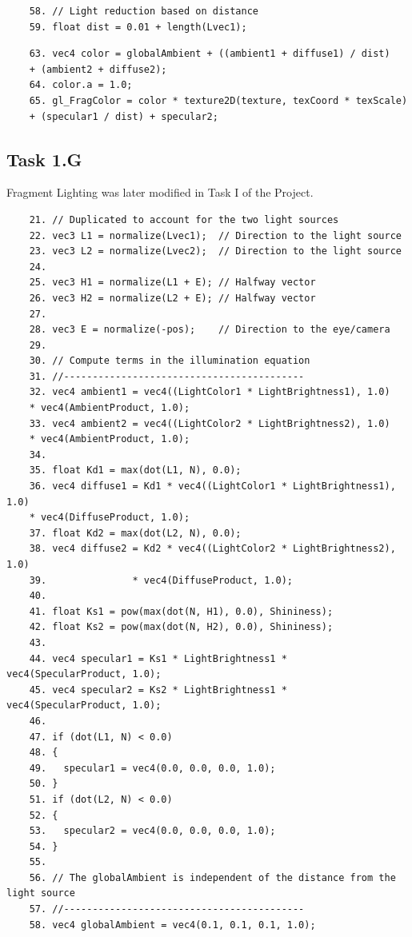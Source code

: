 \documentclass{article}
\begin{document}
\begin{commandlineF}
	\begin{verbatim}
	58. // Light reduction based on distance
	59. float dist = 0.01 + length(Lvec1);
	\end{verbatim}
\end{commandlineF}

\begin{commandlineF}
	\begin{verbatim}
	63. vec4 color = globalAmbient + ((ambient1 + diffuse1) / dist) 
	+ (ambient2 + diffuse2);
	64. color.a = 1.0;
	65. gl_FragColor = color * texture2D(texture, texCoord * texScale) 
	+ (specular1 / dist) + specular2;
	\end{verbatim}
\end{commandlineF}

\subsection{Task 1.G}\label{sec:1G}

\begin{info} %
	Fragment Lighting was later modified in Task I of the Project.
\end{info}


\begin{commandlineF}
	\begin{verbatim}
	21. // Duplicated to account for the two light sources
	22. vec3 L1 = normalize(Lvec1);  // Direction to the light source
	23. vec3 L2 = normalize(Lvec2);  // Direction to the light source
	24. 
	25. vec3 H1 = normalize(L1 + E); // Halfway vector
	26. vec3 H2 = normalize(L2 + E); // Halfway vector
	27. 
	28. vec3 E = normalize(-pos);    // Direction to the eye/camera
	29. 
	30. // Compute terms in the illumination equation
	31. //------------------------------------------
	32. vec4 ambient1 = vec4((LightColor1 * LightBrightness1), 1.0)
	* vec4(AmbientProduct, 1.0);
	33. vec4 ambient2 = vec4((LightColor2 * LightBrightness2), 1.0)
	* vec4(AmbientProduct, 1.0);
	34. 
	35. float Kd1 = max(dot(L1, N), 0.0);
	36. vec4 diffuse1 = Kd1 * vec4((LightColor1 * LightBrightness1), 1.0)
	* vec4(DiffuseProduct, 1.0);
	37. float Kd2 = max(dot(L2, N), 0.0);
	38. vec4 diffuse2 = Kd2 * vec4((LightColor2 * LightBrightness2), 1.0)
	39.               * vec4(DiffuseProduct, 1.0);
	40. 
	41. float Ks1 = pow(max(dot(N, H1), 0.0), Shininess);
	42. float Ks2 = pow(max(dot(N, H2), 0.0), Shininess);
	43. 
	44. vec4 specular1 = Ks1 * LightBrightness1 * vec4(SpecularProduct, 1.0);
	45. vec4 specular2 = Ks2 * LightBrightness1 * vec4(SpecularProduct, 1.0); 
	46. 
	47. if (dot(L1, N) < 0.0)
	48. {
	49.   specular1 = vec4(0.0, 0.0, 0.0, 1.0);
	50. }
	51. if (dot(L2, N) < 0.0)
	52. {
	53.   specular2 = vec4(0.0, 0.0, 0.0, 1.0);
	54. }
	55.
	56. // The globalAmbient is independent of the distance from the light source
	57. //------------------------------------------
	58. vec4 globalAmbient = vec4(0.1, 0.1, 0.1, 1.0);
	\end{verbatim}
\end{commandlineF}
\end{document}

